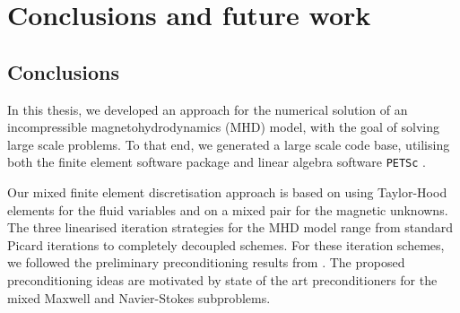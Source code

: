 \chapter{Conclusions and future work}

\section{Conclusions}

In this thesis, we developed an approach for the  numerical solution of an incompressible magnetohydrodynamics (MHD) model, with the goal of solving large scale problems. To that end, we generated a large scale code base, utilising both the finite element software package \fenics \cite{wells2012automated} and linear algebra software {\tt PETSc} \cite{petsc-web-page,petsc-user-ref}.

Our mixed finite element discretisation approach is based on using Taylor-Hood elements for the fluid variables and on a mixed \nedelec pair for the magnetic unknowns. The three linearised iteration strategies for the MHD model range from standard Picard iterations to completely decoupled schemes. For these iteration schemes, we followed the preliminary preconditioning results from \cite{li2010numerical}. The proposed preconditioning ideas are motivated by state of the art preconditioners for the mixed Maxwell and Navier-Stokes subproblems. %



